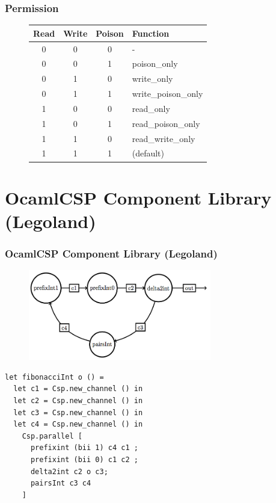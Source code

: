 \documentclass{beamer}
\begin{document}
\begin{frame}
  \frametitle{Permission}
  \begin{figure}[h]
    \centering
    \begin{tabular}{c|c|c|l}
      Read & Write & Poison & Function \\
      \hline
      0 & 0 & 0 & - \\
      0 & 0 & 1 & poison\_only \\
      0 & 1 & 0 & write\_only \\
      0 & 1 & 1 & write\_poison\_only \\
      1 & 0 & 0 & read\_only \\
      1 & 0 & 1 & read\_poison\_only \\
      1 & 1 & 0 & read\_write\_only \\
      1 & 1 & 1 & (default) \\
    \end{tabular}
  \end{figure}
\end{frame}




\section[Legoland]{OcamlCSP Component Library (Legoland)}
\begin{frame}[fragile]
  \frametitle{OcamlCSP Component Library (Legoland)}
  \begin{figure}[htp]
    \begin{center}
      \includegraphics[width=8cm,keepaspectratio=true]{figures/fib.png}
    \end{center}
  \end{figure}
\tiny
\begin{verbatim}
let fibonacciInt o () =
  let c1 = Csp.new_channel () in
  let c2 = Csp.new_channel () in
  let c3 = Csp.new_channel () in
  let c4 = Csp.new_channel () in
    Csp.parallel [
      prefixint (bii 1) c4 c1 ;
      prefixint (bii 0) c1 c2 ;
      delta2int c2 o c3;
      pairsInt c3 c4
    ]
\end{verbatim}
\normalsize
\end{frame}
\end{document}
